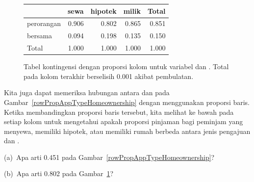 \begin{figure}[h]
\centering%
\begin{tabular}{l rrr r}
  \hline
  & sewa & hipotek & milik & Total \\
  \hline
  perorangan &
      0.906 &
      0.802 &
      0.865 &
      0.851 \\
  bersama &
      0.094 &
      0.198 &
      0.135 &
      0.150 \\
  \hline
  Total & 1.000 & 1.000 & 1.000 & 1.000 \\
  \hline
\end{tabular}
\caption{Tabel kontingensi dengan proporsi kolom untuk variabel
     dan .
    Total pada kolom terakhir berselisih 0.001
    akibat pembulatan.}
\label{colPropAppTypeHomeownership}
\end{figure}

Kita juga dapat memeriksa hubungan antara  dan  pada Gambar~\ref{rowPropAppTypeHomeownership} dengan menggunakan proporsi baris. Ketika membandingkan proporsi baris tersebut, kita melihat ke bawah pada setiap kolom untuk mengetahui apakah proporsi pinjaman bagi peminjam yang menyewa, memiliki hipotek, atau memiliki rumah berbeda antara jenis pengajuan  dan .

\D{\newpage}

\begin{exercisewrap}
\begin{nexercise}
(a)~Apa arti 0.451 pada
Gambar~\ref{rowPropAppTypeHomeownership}?

(b)~Apa arti 0.802 pada
Gambar~\ref{colPropAppTypeHomeownership}?\footnotemark{}
\end{nexercise}
\end{exercisewrap}

